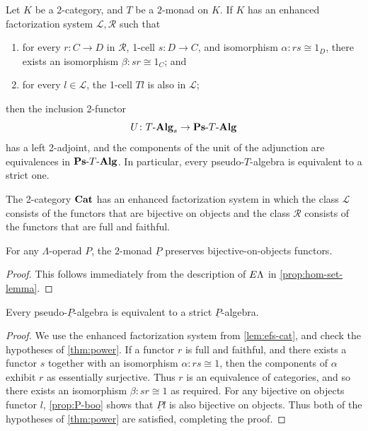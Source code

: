 \begin{thm}\label{thm:power}
Let $K$ be a 2-category, and $T$ be a $2$-monad on $K$. If $K$ has an enhanced factorization system $\mathcal{L}, \mathcal{R}$ such that 
\begin{enumerate}
\item for every $r \colon C \to D$ in $\mathcal{R}$, 1-cell $s \colon D \to C$, and isomorphism $\alpha \colon rs \cong 1_{D}$, there exists an isomorphism $\beta \colon sr \cong 1_C$; and
\item for every $l \in \mathcal{L}$, the 1-cell $Tl$ is also in $\mathcal{L}$;
\end{enumerate}
then the inclusion 2-functor  \[
        U \colon T\mbox{-}\mathbf{Alg}_s \rightarrow \mathbf{Ps}\mbox{-}T\mbox{-}\mathbf{Alg}
    \]
has a left 2-adjoint, and the components of the unit of the adjunction are equivalences in $\mathbf{Ps}\mbox{-}T\mbox{-}\mathbf{Alg}$. In particular, every pseudo-$T$-algebra is equivalent to a strict one.
\end{thm}

\begin{lem}\label{lem:efs-cat}
The 2-category $\mathbf{Cat}$ has an enhanced factorization system in which the class $\mathcal{L}$ consists of the functors that are bijective on objects and the class $\mathcal{R}$ consists of the functors that are full and faithful.
\end{lem}



\begin{prop}\label{prop:P-boo}
For any $\Lambda$-operad $P$, the $2$-monad $\underline{P}$ preserves bijective-on-objects functors.
\end{prop}
\begin{proof}
This follows immediately from the description of $E\Lambda$ in \cref{prop:hom-set-lemma}.
\end{proof}

\begin{cor}\label{cor:coherence-for-ulP}
Every pseudo-$\underline{P}$-algebra is equivalent to a strict $\underline{P}$-algebra.
\end{cor}
\begin{proof}
We use the enhanced factorization system from \cref{lem:efs-cat}, and check the hypotheses of \cref{thm:power}. If a functor $r$ is full and faithful, and there exists a functor $s$ together with an isomorphism $\alpha \colon rs \cong 1$, then the components of $\alpha$ exhibit $r$ as essentially surjective. Thus $r$ is an equivalence of categories, and so there exists an isomorphism $\beta \colon sr \cong 1$ as required. For any bijective on objects functor $l$, \cref{prop:P-boo} shows that $\underline{P}l$ is also bijective on objects. Thus both of the hypotheses of \cref{thm:power} are satisfied, completing the proof.
\end{proof}

